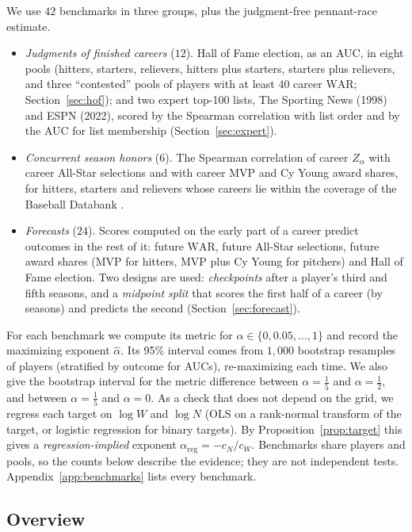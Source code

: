 \documentclass[11pt,letterpaper]{article}
\theoremstyle{plain}
\theoremstyle{definition}
\theoremstyle{remark}
\newcommand{\WAR}{\mathrm{WAR}}
\begin{document}
We use $42$ benchmarks in three groups, plus the judgment-free pennant-race estimate.
\begin{itemize}
    \item \emph{Judgments of finished careers} ($12$). Hall of Fame election, as an AUC, in eight pools (hitters, starters, relievers, hitters plus starters, starters plus relievers, and three ``contested'' pools of players with at least $40$ career $\WAR$; Section~\ref{sec:hof}); and two expert top-100 lists, The Sporting News (1998) and ESPN (2022), scored by the Spearman correlation with list order and by the AUC for list membership (Section~\ref{sec:expert}).
    \item \emph{Concurrent season honors} ($6$). The Spearman correlation of career $Z_\alpha$ with career All-Star selections and with career MVP and Cy Young award shares, for hitters, starters and relievers whose careers lie within the coverage of the Baseball Databank \cite{lahman}.
    \item \emph{Forecasts} ($24$). Scores computed on the early part of a career predict outcomes in the rest of it: future $\WAR$, future All-Star selections, future award shares (MVP for hitters, MVP plus Cy Young for pitchers) and Hall of Fame election. Two designs are used: \emph{checkpoints} after a player's third and fifth seasons, and a \emph{midpoint split} that scores the first half of a career (by seasons) and predicts the second (Section~\ref{sec:forecast}).
\end{itemize}
For each benchmark we compute its metric for $\alpha \in \{0, 0.05, \ldots, 1\}$ and record the maximizing exponent $\hat\alpha$. Its 95\% interval comes from $1{,}000$ bootstrap resamples of players (stratified by outcome for AUCs), re-maximizing each time. We also give the bootstrap interval for the metric difference between $\alpha = \tfrac15$ and $\alpha = \tfrac12$, and between $\alpha = \tfrac15$ and $\alpha = 0$. As a check that does not depend on the grid, we regress each target on $\log W$ and $\log N$ (OLS on a rank-normal transform of the target, or logistic regression for binary targets). By Proposition~\ref{prop:target} this gives a \emph{regression-implied} exponent $\alpha_{\mathrm{reg}} = -c_N/c_W$. Benchmarks share players and pools, so the counts below describe the evidence; they are not independent tests. Appendix~\ref{app:benchmarks} lists every benchmark.

\subsection{Overview}
\label{sec:overview}
\end{document}
